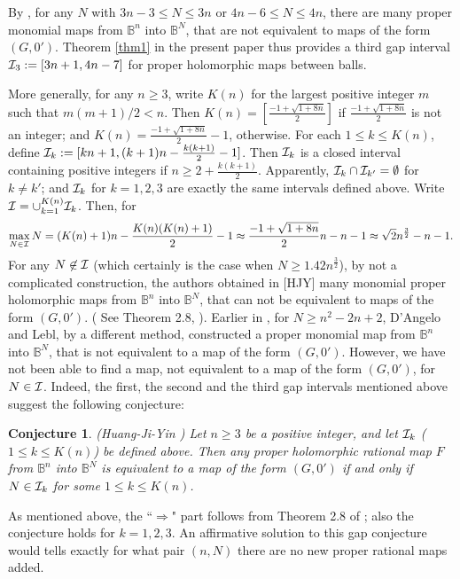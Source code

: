 \documentclass[12pt]{article}
\numberwithin{equation}{section}
\def\BB{{\mathbb B}}
\newtheorem{conjecture}[theorem]{Conjecture}
\begin{document}
By \cite{HJY}, for any $N$ with  $3n-3\le N\le 3n$ or $4n-6\le N\le 4n$,
there are many proper  monomial  maps from ${\BB}^n$ into ${\BB}^N$,
that are not equivalent to  maps of the form $(G,0')$. Theorem
\ref{thm1} in the present paper thus provides a third gap interval
${\cal I}_3:=[3n+1,4n-7]$ for proper holomorphic maps between balls.

More generally, for any $n\ge 3$, write $K(n)$ for  the largest
positive integer $m$ such that $m(m+1)/2<n$. Then
$K(n)=[\frac{-1+\sqrt{1+8n}}{2}]$ if $\frac{-1+\sqrt{1+8n}}{2}$ is
not an integer; and $K(n)=\frac{-1+\sqrt{1+8n}}{2}-1$, otherwise.
For each $1\le k\le K(n)$, define ${\cal I}_k:
=[kn+1,(k+1)n-\frac{k(k+1)}{2}-1]$. Then ${\cal I}_k$ is a closed
interval containing positive integers if $n\ge 2+\frac{k(k+1)}{2}$.
Apparently, ${\cal I}_{k}\cap{\cal I}_{k'}=\emptyset$ for $k\not
=k'$; and ${\cal I}_k$ for $k=1,2,3$ are exactly the same intervals
defined above. Write ${\cal I}=\cup _{k=1}^{K(n)}{\cal I}_k$. Then,
for $$\max_{N \in {\cal
I}}N=(K(n)+1)n-\frac{K(n)(K(n)+1)}{2}-1\approx
\frac{-1+\sqrt{1+8n}}{2}n-n-1\approx \sqrt{2}n^{\frac{3}{2}}-n-1.$$
 For any $N\not \in {\cal I}$ (which certainly is the case when
 $ N\ge 1.42n^{\frac{3}{2}}$), by not a complicated construction,
the authors obtained in [HJY] many monomial proper holomorphic maps
from ${\BB}^n$ into ${\BB}^N$, that can not be equivalent to maps of
the form $(G,0')$. ( See Theorem 2.8, \cite{HJY}). Earlier in
\cite{DL}, for $N\ge n^2-2n+2$, D'Angelo and Lebl, by a different
method, constructed a proper monomial map from ${\BB}^n$ into
${\BB}^N$, that is not equivalent to a map of the form $(G,0')$.
However, we have  not been able to find a map, not equivalent to a
map of the form $(G,0')$, for $N\in {\cal I}$. Indeed, the first,
the second and the third gap intervals mentioned above suggest the
following
 conjecture:

\begin{conjecture}\label{conj1} (Huang-Ji-Yin \cite{HJY}) Let $n\ge 3$ be
a positive integer, and let ${\cal I}_k$ ($1\le k\le K(n)$) be
defined above.
 Then
 any  proper
holomorphic rational  map $F$ from ${\BB}^n$ into ${\BB}^N$  is
equivalent to a map of the form $(G,0')$ if and only if $N\in {\cal
I}_k$ for some $1\le k\le K(n)$.
\end{conjecture}
As mentioned above, the ``$\Longrightarrow$" part follows from
Theorem 2.8 of \cite{HJY}; also   the
 conjecture holds for $k=1,2,3$. An affirmative solution to this gap conjecture would
tells exactly for what pair $(n,N)$ there are no new  proper
rational maps  added.
\end{document}
